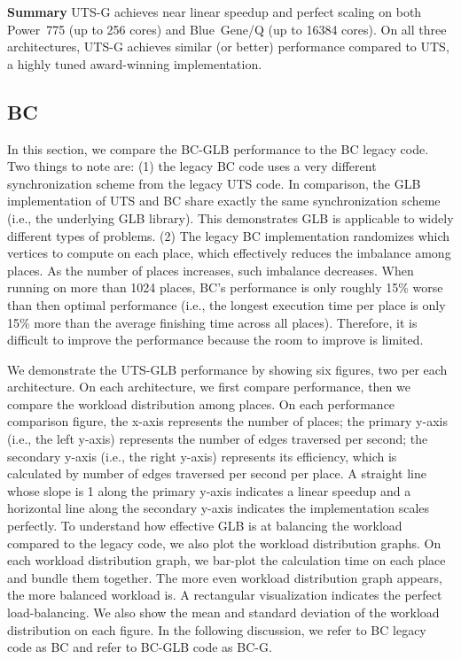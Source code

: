 \textbf{Summary} UTS-G achieves near linear speedup and perfect scaling on both Power~775 (up to 256 cores) and Blue~Gene/Q (up to 16384 cores). On all three architectures, UTS-G achieves similar (or better) performance compared to UTS, a highly tuned award-winning implementation.


\subsection{BC}
In this section, we compare the BC-GLB performance to the BC legacy
code. Two things to note are: (1) the legacy BC code uses a very
different synchronization scheme from the legacy UTS code. In
comparison, the GLB implementation of UTS and BC share exactly the
same synchronization scheme (i.e., the underlying GLB library). This
demonstrates GLB is applicable to widely different types of
problems. (2) The legacy BC implementation randomizes which vertices
to compute on each place, which effectively reduces the imbalance
among places. As the number of places increases, such imbalance
decreases. When running on more than 1024 places, BC's performance is
only roughly 15\% worse than then optimal performance (i.e., the longest execution time per place is only 15\% more than the average finishing time across all places). Therefore, it is difficult to improve the performance because the room to improve is limited. 

We demonstrate the UTS-GLB performance by showing six figures, two per each architecture. On each architecture, we first compare performance, then we compare the workload distribution among places.   
On each performance comparison figure, the x-axis represents the number of places; the primary y-axis (i.e., the left y-axis) represents the number of edges traversed per second; the secondary y-axis (i.e., the right y-axis) represents its efficiency, which is calculated by number of edges traversed per second per place. A straight line whose slope is 1 along the primary y-axis indicates a linear speedup and a horizontal line along the secondary y-axis indicates the implementation scales perfectly. To understand how effective GLB is at balancing the workload compared to the legacy code, we also plot the workload distribution graphs. On each workload distribution graph, we bar-plot the calculation time on each place and bundle them together. The more even workload distribution graph appears, the more balanced workload is. A rectangular visualization indicates the perfect load-balancing. We also show the mean and standard deviation of the workload distribution on each figure. In the following discussion, we refer to BC legacy code as BC and refer to BC-GLB code as BC-G. 

